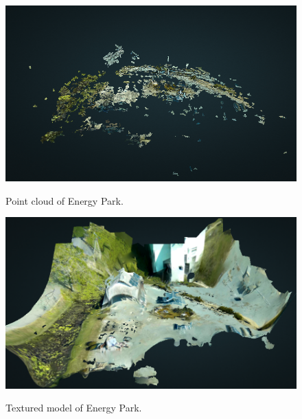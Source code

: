\begin{figure}
	\centering
	\caption[Point cloud of Energy Park.]{\small Point cloud of Energy Park.} 
	\includegraphics[width=5in]{figures/experiment/real-pointcloud}
	\label{fig:real-pointcloud}
\end{figure}

\begin{figure}
	\centering
	\caption[Textured mesh of Energy Park.]{\small Textured model of Energy Park.} 
	\includegraphics[width=5in]{figures/experiment/real-textured-map}
	\label{fig:real-textured-map}
\end{figure}

